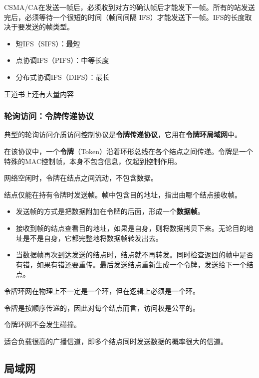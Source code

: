 \documentclass[12pt, a4paper, oneside]{ctexart}
\begin{document}
\begin{enumerate}
    CSMA/CA在发送一帧后，必须收到对方的确认帧后才能发下一帧。所有的站发送完后，必须等待一个很短的时间（帧间间隔 IFS）才能发送下一帧。IFS的长度取决于要发送的帧类型。
    \begin{itemize}
        \item 短IFS（SIFS）：最短
        \item 点协调IFS（PIFS）：中等长度
        \item 分布式协调IFS（DIFS）：最长
    \end{itemize}

    王道书上还有大量内容
\end{enumerate}

\subsubsection{轮询访问：令牌传递协议}

典型的轮询访问介质访问控制协议是\textbf{令牌传递协议}，它用在\textbf{令牌环局域网}中。

在该协议中，一个\textbf{令牌}（Token）沿着环形总线在各个结点之间传递。令牌是一个特殊的MAC控制帧，本身不包含信息，仅起到控制作用。

网络空闲时，令牌在结点之间流动，不包含数据。

结点仅能在持有令牌时发送帧。帧中包含目的地址，指出由哪个结点接收帧。
\begin{itemize}
    \item 发送帧的方式是把数据附加在令牌的后面，形成一个\textbf{数据帧}。
    \item 接收到帧的结点查看目的地址，如果是自身，则将数据拷贝下来。无论目的地址是不是自身，它都完整地将数据帧转发出去。
    \item 当数据帧再次到达发送的结点时，结点就不再转发。同时检查返回的帧中是否有错，如果有错还要重传。最后发送结点重新生成一个令牌，发送给下一个结点。
\end{itemize}

令牌环网在物理上不一定是一个环，但在逻辑上必须是一个环。

令牌是按顺序传递的，因此对每个结点而言，访问权是公平的。

令牌环网不会发生碰撞。

适合负载很高的广播信道，即多个结点同时发送数据的概率很大的信道。

\subsection{局域网}
\end{document}
